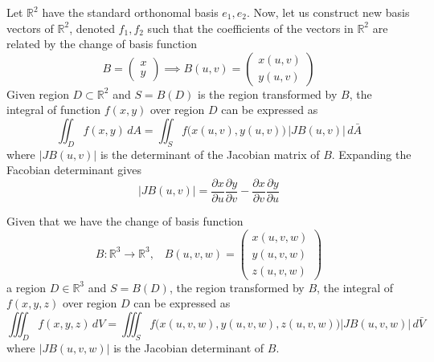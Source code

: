   \begin{theorem}
  Let $\mathbb{R}^2$ have the standard orthonomal basis $e_1, e_2$. Now, let us construct new basis vectors of $\mathbb{R}^2$, denoted $f_1, f_2$ such that the coefficients of the vectors in $\mathbb{R}^2$ are related by the change of basis function 
  \[B = \begin{pmatrix} x \\ y \end{pmatrix} \implies B(u, v) = \begin{pmatrix} x(u, v) \\ y(u, v) \end{pmatrix}\]
  Given region $D \subset \mathbb{R}^2$ and $S = B(D)$ is the region transformed by $B$, the integral of function $f(x, y)$ over region $D$ can be expressed as 
  \[\iint_D f(x, y) \, dA = \iint_S f \big( x(u, v), y(u, v) \big) \, \big| J B(u, v) \big| \, d \bar{A}\]
  where $\big| J B(u, v) \big|$ is the determinant of the Jacobian matrix of $B$. Expanding the Facobian determinant gives
  \[\big| J B(u, v) \big| = \frac{\partial x}{\partial u} \frac{\partial y}{\partial v} - \frac{\partial x}{\partial v} \frac{\partial y}{\partial u}\]
  \end{theorem}

  \begin{theorem}
  Given that we have the change of basis function 
  \[B: \mathbb{R}^3 \longrightarrow \mathbb{R}^3, \;\;\; B(u, v, w) = \begin{pmatrix} x(u, v, w) \\ y(u, v, w) \\ z(u, v, w) \end{pmatrix}\]
  a region $D \in \mathbb{R}^3$ and $S = B(D)$, the region transformed by $B$, the integral of $f(x, y, z)$ over region $D$ can be expressed as 
  \[\iiint_D f(x, y, z)\, dV = \iiint_S f\big( x(u, v, w), y(u, v ,w), z(u, v, w) \big) \big| J B (u, v, w)\big| \, d \bar{V}\]
  where $\big| J B (u, v, w)\big|$ is the Jacobian determinant of $B$. 
  \end{theorem}

